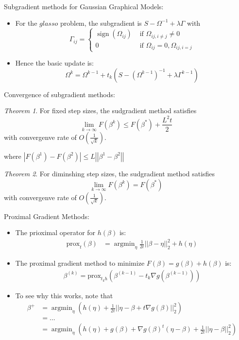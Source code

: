 \documentclass[xcolor=dvipsnames,aspectratio=1610]{beamer}
\newcommand{\norm}[1]{\left|\left|#1\right|\right|}
\newcommand{\abs}[1]{\left|#1\right|}
\DeclareMathOperator*{\sign}{sign}
\DeclareMathOperator*{\argmin}{argmin}
\theoremstyle{remark}
\newtheorem{thm}{Theorem}
\begin{document}
\begin{frame}{Subgradient methods for Gaussian Graphical Models:}
  \begin{itemize}
    \setlength{\itemsep}{10pt}
  \item For the $glasso$ problem, the subgradient is $ S - \Omega^{-1} + \lambda \Gamma$ with
$$
\Gamma_{ij} = \begin{cases}
\sign(\Omega_{ij}) &\text{ if } \Omega_{ij ,i \neq j} \neq 0\\
0 &\text{ if } \Omega_{ij} = 0, \Omega_{ij, i = j}
\end{cases}
$$
\item Hence the basic update is:
$$\Omega^k = \Omega^{k-1} + t_k ( S - (\Omega^{k-1})^{-1} + \lambda \Gamma^{k-1})$$
  \end{itemize}
\end{frame}

\begin{frame}{Convergence of subgradient methods:}
\begin{thm}
For fixed step sizes, the sudgradient method satisfies 
$$
\lim_{k \to \infty} F(\beta^k) \leq F(\beta^*) + \frac{L^2t}{2}
$$
with convergenve rate of $O(\frac{1}{\sqrt{k}})$.
\end{thm}
where $\abs{F(\beta^1) - F(\beta^2)} \leq L \norm{\beta^1 - \beta^2}$

\begin{thm}
For diminshing step sizes, the sudgradient method satisfies 
$$
\lim_{k \to \infty} F(\beta^k) = F(\beta^*)
$$
with convergenve rate of $O(\frac{1}{\sqrt{k}})$.
\end{thm}
\end{frame}

\begin{frame}{Proximal Gradient Methods:}
  \begin{itemize}
    \setlength{\itemsep}{10pt}
\item The prioximal operator for $h(\beta)$ is: \begin{align*}
\text{prox}_t(\beta) &= \argmin_{\eta} \frac{1}{2t} \norm{\beta-\eta}_2^2 + h(\eta)
\end{align*}
  \item The proximal gradient method to minimize $F(\beta) = g(\beta) + h(\beta)$ is:
\begin{align*}
\beta^{(k)} = \text{prox}_{t_kh}(\beta^{(k-1)}-t_k \nabla g(\beta^{(k-1)}))
\end{align*}
\item To see why this works, note that
\begin{align*}
\beta^+ &= \argmin_{\eta} (h(\eta) + \frac{1}{2t} \norm{\eta - \beta + t \nabla g(\beta)}_2^2) \\
&= ...\\
&= \argmin_{\eta} (h(\eta) + g(\beta) + \nabla g(\beta)^t(\eta - \beta) + \frac{1}{2t} \norm{\eta - \beta}_2^2) 
\end{align*}
  \end{itemize}
\end{frame}
\end{document}
